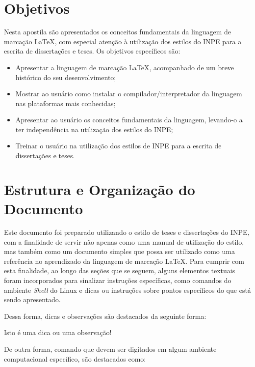 \section{Objetivos}
\label{sec:objetivos}

Nesta apostila são apresentados os conceitos fundamentais da linguagem de marcação \LaTeX{}, com especial atenção à utilização dos estilos do INPE para a escrita de dissertações e teses. Os objetivos específicos são:

\begin{itemize}
    \item Apresentar a linguagem de marcação \LaTeX{}, acompanhado de um breve histórico do seu desenvolvimento;
    \item Mostrar ao usuário como instalar o compilador/interpretador da linguagem nas plataformas mais conhecidas;
    \item Apresentar ao usuário os conceitos fundamentais da linguagem, levando-o a ter independência na utilização dos estilos do INPE;
    \item Treinar o usuário na utilização dos estilos de INPE para a escrita de dissertações e teses.
\end{itemize}

\section{Estrutura e Organização do Documento}
\label{sec:estrutura}

Este documento foi preparado utilizando o estilo de teses e dissertações do INPE, com a finalidade de servir não apenas como uma manual de utilização do estilo, mas também como um documento simples que possa ser utilizado como uma referência no aprendizado da linguagem de marcação LaTeX. Para cumprir com esta finalidade, ao longo das seções que se seguem, alguns elementos textuais foram incorporados para sinalizar instruções específicas, como comandos do ambiente \textit{Shell} do Linux e dicas ou instruções sobre pontos específicos do que está sendo apresentado. 

Dessa forma, dicas e observações são destacados da seguinte forma:

\begin{marker}
Isto é uma dica ou uma observação!
\end{marker}

De outra forma, comando que devem ser digitados em algum ambiente computacional específico, são destacados como:

